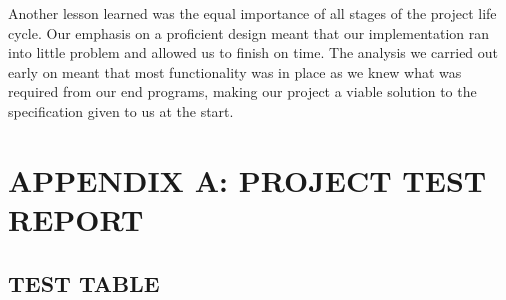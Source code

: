 \documentclass{project}
\begin{document}
Another lesson learned was the equal importance of all stages of the project life cycle. Our emphasis on a proficient design meant that our implementation ran into little problem and allowed us to finish on time. The analysis we carried out early on meant that most functionality was in place as we knew what was required from our end programs, making our project a viable solution to the specification given to us at the start.

\newpage

\section{APPENDIX A: PROJECT TEST REPORT}
\subsection{TEST TABLE}
\end{document}
